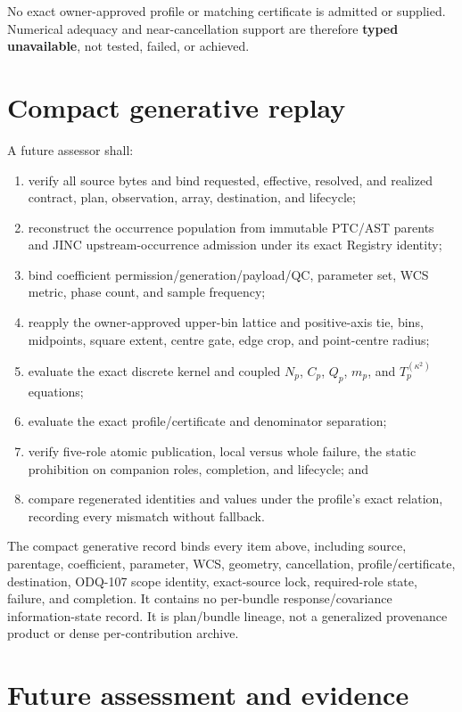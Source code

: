 \documentclass[10pt]{article}
\begin{document}
No exact owner-approved profile or matching certificate is admitted or
supplied.  Numerical adequacy and near-cancellation support are therefore
\textbf{typed unavailable}, not tested, failed, or achieved.

\section{Compact generative replay}
\label{sec:eng-replay}

A future assessor shall:

\begin{enumerate}
\item verify all source bytes and bind requested, effective, resolved, and
realized contract, plan, observation, array, destination, and lifecycle;
\item reconstruct the occurrence population from immutable PTC/AST parents
and JINC upstream-occurrence admission under its exact Registry identity;
\item bind coefficient permission/generation/payload/QC, parameter set, WCS
metric, phase count, and sample frequency;
\item reapply the owner-approved upper-bin lattice and positive-axis tie,
bins, midpoints, square extent, centre gate,
edge crop, and point-centre radius;
\item evaluate the exact discrete kernel and coupled $N_p$, $C_p$, $Q_p$,
$m_p$, and $T_p^{(\kappa^2)}$ equations;
\item evaluate the exact profile/certificate and denominator separation;
\item verify five-role atomic publication, local versus whole failure, the
static prohibition on companion roles, completion, and lifecycle; and
\item compare regenerated identities and values under the profile's exact
relation, recording every mismatch without fallback.
\end{enumerate}

The compact generative record binds every item above, including source,
parentage, coefficient, parameter, WCS, geometry, cancellation,
profile/certificate, destination, ODQ-107 scope identity, exact-source lock,
required-role state, failure, and completion.  It contains no per-bundle response/covariance
information-state record.
It is plan/bundle lineage, not a generalized provenance product or dense
per-contribution archive.

\section{Future assessment and evidence}
\label{sec:eng-procedure}
\end{document}
